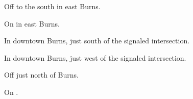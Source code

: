 

\begin{LocationList}

Off  to the south in east Burns.

On  in east Burns.

In downtown Burns, just south of the signaled intersection.

In downtown Burns, just west of the signaled intersection.

Off  just north of Burns.

\Location{\TruckStop \Gas \Rest \Service \Weigh}
On  .

\end{LocationList}
